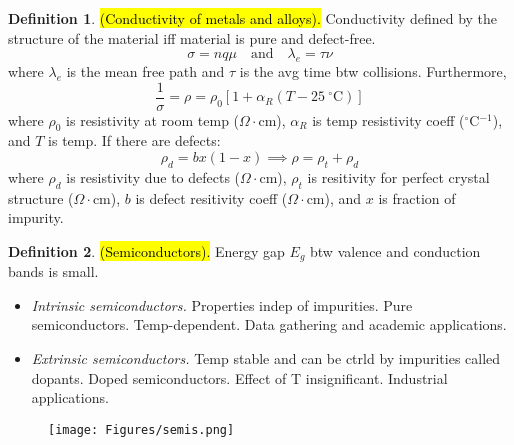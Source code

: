 \documentclass{article}
\theoremstyle{definition}
\newtheorem{definition}{Definition}[section]
\begin{document}
\begin{definition}
    \hl{(Conductivity of metals and alloys).} Conductivity defined by the structure of the material iff material is pure and defect-free.
    \begin{equation}
        \sigma = nq \mu \quad \text{and} \quad \lambda_e = \tau \nu
    \end{equation}
    where $\lambda_e$ is the mean free path and $\tau$ is the avg time btw collisions. Furthermore,
    \begin{equation}
        \frac{1}{\sigma} = \rho = \rho_0 [1 + \alpha_R (T - 25\ ^\circ \text{C})]
    \end{equation}
    where $\rho_0$ is resistivity at room temp ($\Omega \cdot$cm), $\alpha_R$ is temp resistivity coeff ($^\circ$C$^{-1}$), and $T$ is temp. If there are defects:
    \begin{equation}
        \rho_d = bx(1-x) \implies \rho = \rho_t + \rho_d
    \end{equation}
    where $\rho_d$ is resistivity due to defects ($\Omega \cdot$cm), $\rho_t$ is resitivity for perfect crystal structure ($\Omega \cdot$cm), $b$ is defect resitivity coeff ($\Omega\cdot$cm), and $x$ is fraction of impurity.
\end{definition}

\begin{definition}
    \hl{(Semiconductors).} Energy gap $E_g$ btw valence and conduction bands is small.
    \begin{itemize}
        \item \textit{Intrinsic semiconductors.} Properties indep of impurities. Pure semiconductors. Temp-dependent. Data gathering and academic applications.
        \item \textit{Extrinsic semiconductors.} Temp stable and can be ctrld by impurities called dopants. Doped semiconductors. Effect of T insignificant. Industrial applications.
    \end{itemize}

    \begin{figure}[h]
        \centering
        \texttt{[image: Figures/semis.png]}
    \end{figure}
\end{definition}
\end{document}
